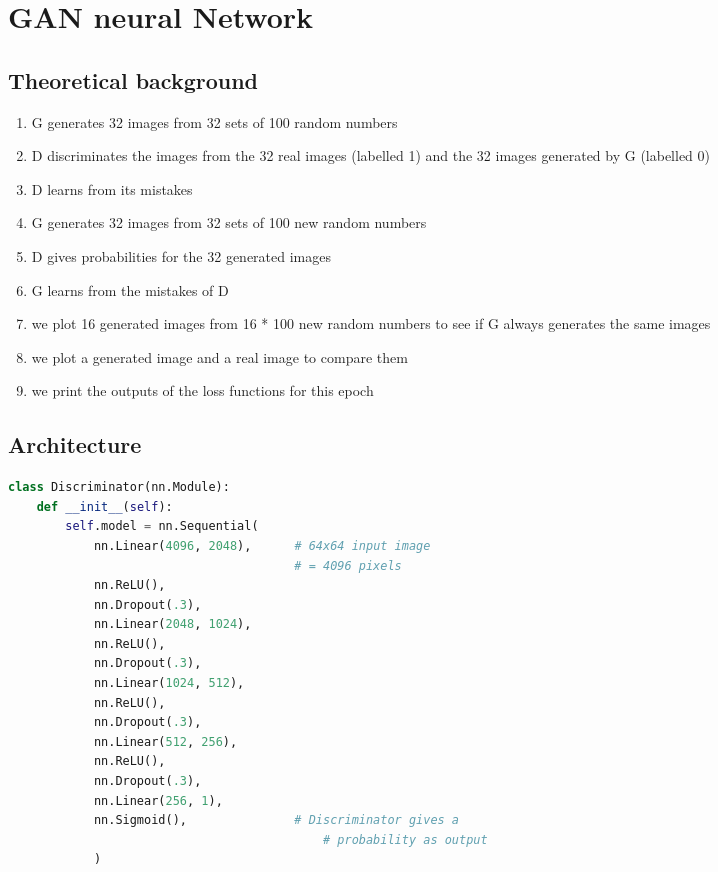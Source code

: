 \documentclass[11pt,a4paper]{report}
\begin{document}
\begin{multicols*}{2}
\begin{figure}[H]
    \end{figure}

    \chapter{GAN neural Network}

    \section{Theoretical background}

    \begin{enumerate}
        \item G generates 32 images from 32 sets of 100 random numbers
        \item D discriminates the images from the
              32 real images (labelled 1) and the 32 images generated by G (labelled 0)
        \item D learns from its mistakes
        \item G generates 32 images from 32 sets of 100 new random numbers
        \item D gives probabilities for the 32 generated images
        \item G learns from the mistakes of D
        \item we plot 16 generated images from 16 * 100 new random numbers to see if G always generates the same images
        \item we plot a generated image and a real image to compare them
        \item we print the outputs of the loss functions for this epoch
    \end{enumerate}

    \section{Architecture}


    \begin{lstlisting}[language=Python, caption=Python example]
class Discriminator(nn.Module):
    def __init__(self):
        self.model = nn.Sequential(
            nn.Linear(4096, 2048),      # 64x64 input image 
                                        # = 4096 pixels
            nn.ReLU(),
            nn.Dropout(.3),
            nn.Linear(2048, 1024),
            nn.ReLU(),
            nn.Dropout(.3),
            nn.Linear(1024, 512),
            nn.ReLU(),
            nn.Dropout(.3),
            nn.Linear(512, 256),
            nn.ReLU(),
            nn.Dropout(.3),
            nn.Linear(256, 1),
            nn.Sigmoid(),               # Discriminator gives a 
                                            # probability as output          
            )
            

\end{lstlisting}
\end{multicols*}
\end{document}
